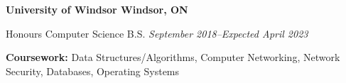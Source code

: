 \textbf{University of Windsor \hfill Windsor, ON} \par
Honours Computer Science B.S. \hfill \textit{September 2018--Expected April 2023}\par
\textbf{Coursework:} Data Structures/Algorithms, Computer Networking, Network Security, Databases, Operating Systems
